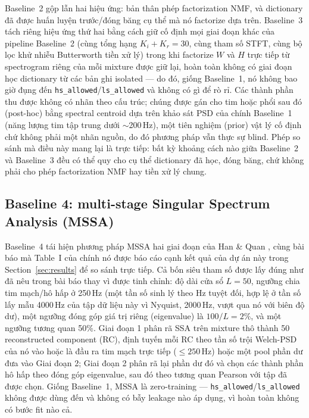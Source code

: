 \documentclass[11pt]{article}
\begin{document}
Baseline~2 gộp lẫn hai hiệu ứng: bản thân phép factorization NMF, và
dictionary đã được huấn luyện trước/đóng băng cụ thể mà nó factorize dựa
trên. Baseline~3 tách riêng hiệu ứng thứ hai bằng cách giữ cố định mọi
giai đoạn khác của pipeline Baseline~2 (cùng tổng hạng
$K_i{+}K_r{=}30$, cùng tham số STFT, cùng bộ lọc khử nhiễu Butterworth
tiền xử lý) trong khi factorize $W$ và $H$ trực tiếp từ spectrogram riêng
của mỗi mixture được giữ lại, hoàn toàn không có giai đoạn học dictionary
từ các bản ghi isolated --- do đó, giống Baseline~1, nó không bao giờ
đụng đến \texttt{hs\_allowed}/\texttt{ls\_allowed} và không có gì để rò
rỉ. Các thành phần thu được không có nhãn theo cấu trúc; chúng được gán
cho tim hoặc phổi sau đó (post-hoc) bằng spectral centroid dựa trên khảo
sát PSD của chính Baseline~1 (năng lượng tim tập trung dưới
$\sim$200\,Hz), một tiên nghiệm (prior) vật lý cố định chứ không phải một
nhãn nguồn, do đó phương pháp vẫn thực sự blind. Phép so sánh mà điều này
mang lại là trực tiếp: bất kỳ khoảng cách nào giữa Baseline~2 và
Baseline~3 đều có thể quy cho cụ thể dictionary đã học, đóng băng, chứ
không phải cho phép factorization NMF hay tiền xử lý chung.

\subsection{Baseline 4: multi-stage Singular Spectrum Analysis (MSSA)}
\label{sec:baseline4}

Baseline~4 tái hiện phương pháp MSSA hai giai đoạn của Han \& Quan
\cite{ssa}, cùng bài báo mà Table~I của chính nó được báo cáo cạnh kết
quả của dự án này trong Section~\ref{sec:results} để so sánh trực tiếp.
Cả bốn siêu tham số được lấy đúng như đã nêu trong bài báo thay vì được
tinh chỉnh: độ dài cửa sổ $L{=}50$, ngưỡng chia tim mạch/hô hấp ở
250\,Hz (một tần số sinh lý theo Hz tuyệt đối, hợp lệ ở tần số lấy mẫu
4000\,Hz của tập dữ liệu này vì Nyquist, 2000\,Hz, vượt qua nó với biên
độ dư), một ngưỡng đóng góp giá trị riêng (eigenvalue) là $100/L = 2\%$,
và một ngưỡng tương quan 50\%. Giai đoạn 1 phân rã SSA trên mixture thô
thành 50 reconstructed component (RC), định tuyến mỗi RC theo tần số
trội Welch-PSD của nó vào hoặc là đầu ra tim mạch trực tiếp
($\le 250$\,Hz) hoặc một pool phần dư đưa vào Giai đoạn 2; Giai đoạn 2
phân rã lại phần dư đó và chọn các thành phần hô hấp theo đóng góp
eigenvalue, sau đó theo tương quan Pearson với tập đã được chọn. Giống
Baseline~1, MSSA là zero-training --- \texttt{hs\_allowed}/\texttt{ls\_allowed}
không được dùng đến và không có bẫy leakage nào áp dụng, vì hoàn toàn
không có bước fit nào cả.
\end{document}
